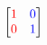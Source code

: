\documentclass[preview]{standalone}
\begin{document}
\begin{align*}
\begin{bmatrix} {\color{red}1} & {\color{blue}0} \\ {\color{red}0} & {\color{blue}1} \end{bmatrix}
\end{align*}
\end{document}
